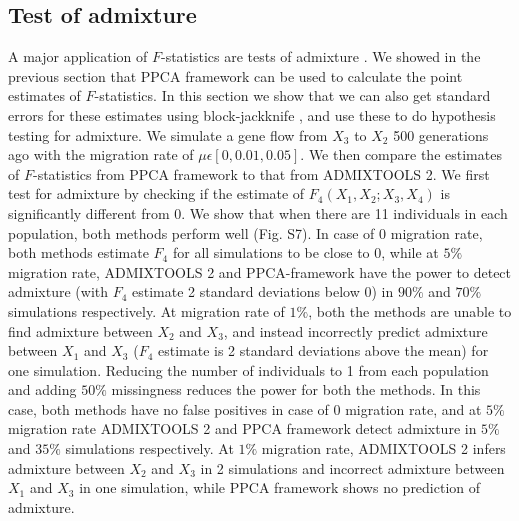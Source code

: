 \documentclass[12pt]{article}
\begin{document}
\subsection{Test of admixture}
A major application of $F$-statistics are tests of admixture \citep{orlando_ancient_2021}. We showed in the previous section that PPCA framework can be used to calculate the point estimates of $F$-statistics. In this section we show that we can also get standard errors for these estimates using block-jackknife \citep{kunsch_jackknife_1989,maier_limits_2022, patterson_modication_2020}, and use these to do hypothesis testing for admixture. We simulate a gene flow from $X_3$ to $X_2$ 500 generations ago with the migration rate of $\mu \epsilon [0, 0.01, 0.05]$. We then compare the estimates of $F$-statistics from PPCA framework to that from ADMIXTOOLS 2. We first test for admixture by checking if the estimate of $F_4(X_1,X_2;X_3,X_4)$ is significantly different from 0. We show that when there are 11 individuals in each population, both methods perform well (Fig. S7). In case of 0 migration rate, both methods estimate $F_4$ for all simulations to be close to 0, while at $5\%$ migration rate, ADMIXTOOLS 2 and PPCA-framework have the power to detect admixture (with $F_4$ estimate 2 standard deviations below 0) in $90\%$ and $70\%$ simulations respectively. At migration rate of $1\%$, both the methods are unable to find admixture between $X_2$ and $X_3$, and instead incorrectly predict admixture between $X_1$ and $X_3$ ($F_4$ estimate is 2 standard deviations above the mean) for one simulation. Reducing the number of individuals to 1 from each population and adding $50\%$ missingness reduces the power for both the methods. In this case, both methods have no false positives in case of 0 migration rate, and at $5\%$ migration rate ADMIXTOOLS 2 and PPCA framework detect admixture in $5\%$ and $35\%$ simulations respectively. At $1\%$ migration rate, ADMIXTOOLS 2 infers admixture between $X_2$ and $X_3$ in 2 simulations and incorrect admixture between $X_1$ and $X_3$ in one simulation, while PPCA framework shows no prediction of admixture.
\end{document}
